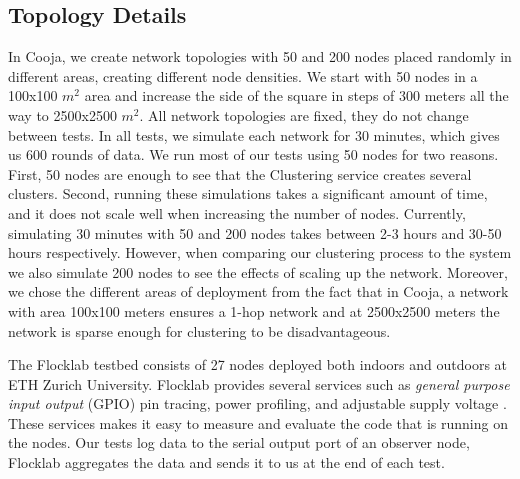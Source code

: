 \subsection{Topology Details}
\label{subsec:evaluation-topology-details}
In Cooja, we create network topologies with 50 and 200 nodes placed randomly in different areas, creating different node densities. We start with 50 nodes in a 100x100 $m^2$ area and increase the side of the square in steps of 300 meters all the way to 2500x2500 $m^2$. All network topologies are fixed, they do not change between tests. In all tests, we simulate each network for 30 minutes, which gives us 600 rounds of data. We run most of our tests using 50 nodes for two reasons. First, 50 nodes are enough to see that the Clustering service creates several clusters. Second, running these simulations takes a significant amount of time, and it does not scale well when increasing the number of nodes. Currently, simulating 30 minutes with 50 and 200 nodes takes between 2-3 hours and 30-50 hours respectively. However, when comparing our clustering process to the \atwo{} system we also simulate 200 nodes to see the effects of scaling up the network. Moreover, we chose the different areas of deployment from the fact that in Cooja, a network with area 100x100 meters ensures a 1-hop network and at 2500x2500 meters the network is sparse enough for clustering to be disadvantageous.

The Flocklab testbed consists of 27 nodes deployed both indoors and outdoors at ETH Zurich University. Flocklab provides several services such as \textit{general purpose input output} (GPIO) pin tracing, power profiling, and adjustable supply voltage \cite{Lim2013-flocklab-introduction}. These services makes it easy to measure and evaluate the code that is running on the nodes. Our tests log data to the serial output port of an observer node, Flocklab aggregates the data and sends it to us at the end of each test.

